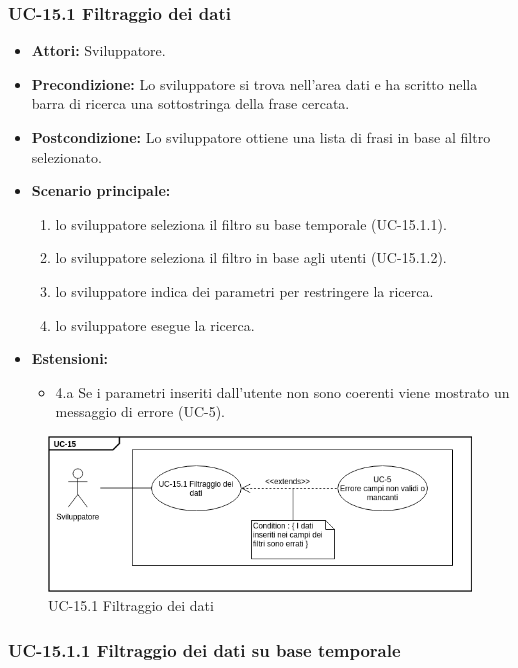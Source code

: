 	\subsubsection{UC-15.1 Filtraggio dei dati}	
		\begin{itemize}
			\item \textbf{Attori:} Sviluppatore.
			\item \textbf{Precondizione:} Lo sviluppatore si trova nell'area dati e ha scritto nella barra di ricerca una sottostringa della frase cercata.
			\item \textbf{Postcondizione:} Lo sviluppatore ottiene una lista di frasi in base al filtro selezionato.
			\item \textbf{Scenario principale:}
				\begin{enumerate}
					\item lo sviluppatore seleziona il filtro su base temporale (UC-15.1.1).
					\item lo sviluppatore seleziona il filtro in base agli utenti (UC-15.1.2).
					\item lo sviluppatore indica dei parametri per restringere la ricerca.
					\item lo sviluppatore esegue la ricerca.
				\end{enumerate}	
			\item \textbf{Estensioni:}
				\begin{itemize}
					\item 4.a Se i parametri inseriti dall'utente non sono coerenti viene mostrato un messaggio di errore (UC-5).
				\end{itemize}		
		\end{itemize}
	\begin{figure}[h]
			\centering
			\includegraphics[scale=0.7]{images/UC-15_1.png}
			\caption{UC-15.1 Filtraggio dei dati}
		\end{figure}	
	
	\subsubsection{UC-15.1.1 Filtraggio dei dati su base temporale}	
		
